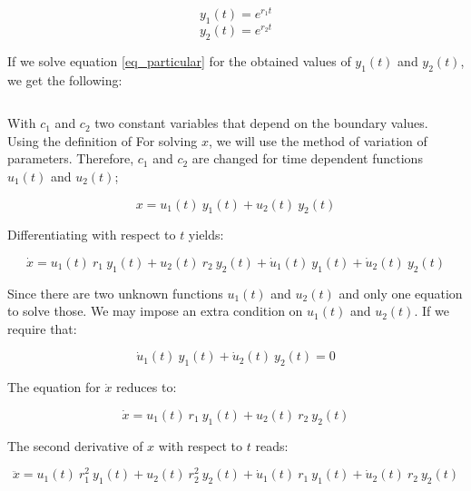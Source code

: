 \begin{equation*}
y_1(t) = e^{r_1 t}
\end{equation*}
\begin{equation*}
y_2(t) = e^{r_2 t}
\end{equation*}

If we solve equation \ref{eq_particular} for the obtained values of $y_1(t)$ and $y_2(t)$, we get the following:

\begin{equation}
	
\end{equation}

With $c_1$ and $c_2$ two constant variables that depend on the boundary values. \\
Using the definition of 
For solving $x$, we will use the method of variation of parameters. Therefore, $c_1$ and $c_2$ are changed for time dependent functions $u_1(t)$ and $u_2(t)$;

\begin{equation*}
	x = u_1(t) \: y_1(t) + u_2(t) \: y_2(t)
\end{equation*}

Differentiating with respect to $t$ yields:

\begin{equation*}
	\dot{x}  = u_1(t) \: r_1 \: y_1(t) + u_2(t) \: r_2 \: y_2(t) + \dot{u}_1(t) \: y_1(t) + \dot{u}_2(t) \: y_2(t)
\end{equation*}

Since there are two unknown functions $u_1(t)$ and $u_2(t)$ and only one equation to solve those. We may impose an extra condition on $u_1(t)$ and $u_2(t)$. If we require that:

\begin{equation}
	\label{eq_condition}
	\dot{u}_1(t) \: y_1(t) + \dot{u}_2(t) \: y_2(t) = 0 
\end{equation}

The equation for $\dot{x}$ reduces to:

\begin{equation*}
	\dot{x}  = u_1(t) \: r_1 \: y_1(t) + u_2(t) \: r_2 \: y_2(t) 
\end{equation*}

The second derivative of $x$ with respect to $t$ reads:

\begin{equation*}
	\ddot{x}  = u_1(t) \: r_1^2 \: y_1(t) + u_2(t) \: r_2^2 \: y_2(t) + \dot{u}_1(t) \: r_1 \: y_1(t) + \dot{u}_2(t) \: r_2 \: y_2(t)
\end{equation*}

